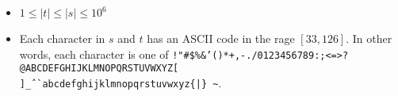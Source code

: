 \begin{itemize}
\tightlist
\item $1 \leq |t| \leq |s| \leq 10^6$
\item Each character in $s$ and $t$ has an ASCII code in the rage $[33, 126]$. In other words, each character is one of \texttt{!"\#\$\%\&'()*+,-./0123456789:;<=>?@ABCDEFGHIJKLMNOPQRSTUVWXYZ[\\]}\texttt{\^\_ \`}\texttt{abcdefghijklmnopqrstuvwxyz\{|\}}\texttt{ \~}.
\end{itemize}
